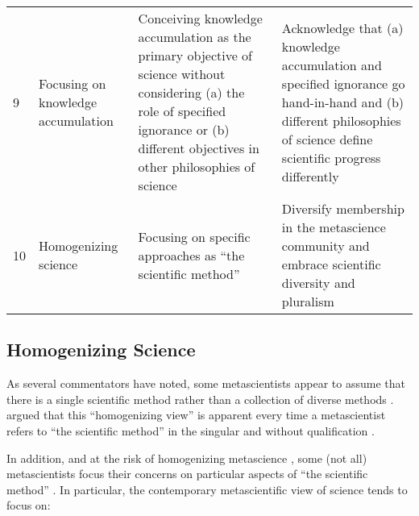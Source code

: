 \documentclass[authordate, meta]{jote-new-article}
\begin{document}
\begin{table*}
\begin{fullwidth}
\begin{tabularx}{\linewidth}{@{} l >{\RaggedRight\arraybackslash}p{12em} >{\RaggedRight\arraybackslash}X >{\RaggedRight\arraybackslash}X@{}}
      9  & Focusing on knowledge accumulation                                                                                                                                                                                                      & Conceiving knowledge accumulation as the primary objective of science without considering (a) the role of specified ignorance or (b) different objectives in other philosophies of science
         & Acknowledge that (a) knowledge accumulation and specified ignorance go hand-in-hand and (b) different philosophies of science define scientific progress differently
      \\

      10 & Homogenizing science                                                                                                                                                                                                                    & Focusing on specific approaches as “the scientific method”
         & Diversify membership in the metascience community and embrace scientific diversity and pluralism
      \\
      \bottomrule
    \end{tabularx}
  \end{fullwidth}
\end{table*}




\subsection{Homogenizing Science}



As several commentators have noted, some metascientists appear to assume that there is a single scientific method rather than a collection of diverse methods \parencites[for commentators, see][]{Drummond2019}{Malich2022}[p. 21]{Peterson2020}[see also][p. 2]{Guttinger2020}. \textcite[pp. 4-6]{Malich2022} argued that this “homogenizing view” is apparent every time a metascientist refers to “the scientific method” in the singular and without qualification \parencites[e.g.,][p. 7]{Munafò2017}[p. 618]{Nosek2012}[p. 13]{Zwaan2018}[for further examples, see][p. 64]{Drummond2019}.



In addition, and at the risk of homogenizing metascience \parencites{Field2022}, some (not all) metascientists focus their concerns on particular aspects of “the scientific method” \parencite{Flis2019}. In particular, the contemporary metascientific view of science tends to focus on:
\end{document}
